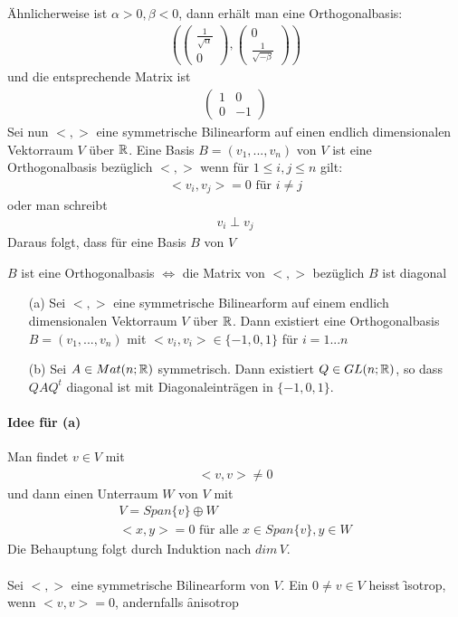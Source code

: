 Ähnlicherweise ist $\alpha > 0, \beta < 0$, dann erhält man eine Orthogonalbasis:
\begin{align}
(\begin{pmatrix} \frac{1}{\sqrt{\alpha}} \\ 0\end{pmatrix} , \begin{pmatrix} 0 \\ \frac{1}{\sqrt{-\beta}}\end{pmatrix})
\end{align}
und die entsprechende Matrix ist
\begin{align}
\begin{pmatrix} 1 & 0 \\ 0 & -1 \end{pmatrix}
\end{align}
Sei nun $<, >$ eine symmetrische Bilinearform auf einen endlich dimensionalen Vektorraum $V$ über $\mathbb{R}$.
Eine Basis $B = (v_1, ..., v_n)$ von $V$ ist eine Orthogonalbasis bezüglich $<, >$ wenn für $1 \leq i, j \leq n$ gilt:
\begin{align}
<v_i, v_j> = 0 \text{ für } i \neq j
\end{align}
oder man schreibt
\begin{align}
v_i \perp v_j
\end{align}
Daraus folgt, dass für eine Basis $B$ von $V$ \\
\begin{center}
$B$ ist eine Orthogonalbasis $\Leftrightarrow$ die Matrix von $<, >$ bezüglich $B$ ist diagonal 
\end{center}

\begin{satz}
\label{satz521}
\begin{itemize}
\item[(a)] Sei $<, >$ eine symmetrische Bilinearform auf einem endlich dimensionalen Vektorraum $V$ über $\mathbb{R}$. Dann existiert eine Orthogonalbasis $B = (v_1, ..., v_n)$ mit $<v_i, v_i> \in \{-1, 0, 1\}$ für $i=1...n$
\item[(b)] Sei $A \in Mat(n; \mathbb{R})$ symmetrisch. Dann existiert $Q \in GL(n; \mathbb{R})$, so dass $QAQ^t$ diagonal ist mit Diagonaleinträgen in $\{-1, 0, 1\}$.
\end{itemize}
\end{satz}
\paragraph{Idee für (a)}
Man findet $v \in V$ mit 
\begin{align}
<v, v> \neq 0
\end{align}
und dann einen Unterraum $W$ von $V$ mit 
\begin{align}
V = Span \{ v \} \oplus W \\
<x, y> = 0 \text{ für alle } x \in Span \{ v \}, y \in W
\end{align}
Die Behauptung folgt durch Induktion nach $dim\, V$. \\\\
Sei $<, >$ eine symmetrische Bilinearform von $V$. Ein $0 \neq v \in V$ heisst \f{isotrop}, wenn $<v, v> = 0$, andernfalls \f{anisotrop}

